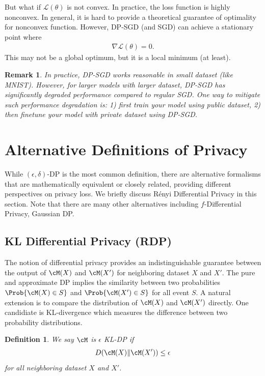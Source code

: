 \documentclass[11pt, a4paper]{article}
\newtheorem{definition}{Definition}
\newtheorem{remark}{Remark}
\begin{document}
But what if $\mathcal{L}(\theta)$ is not convex.
In practice, the loss function is highly nonconvex.
In general, it is hard to provide a theoretical guarantee of optimality for nonconvex function.
However, DP-SGD (and SGD) can achieve a stationary point where
\begin{align}
    \nabla \mathcal{L}(\theta) = 0.
\end{align}
This may not be a global optimum, but it is a local minimum (at least).

\begin{remark}
    In practice, DP-SGD works reasonable in small dataset (like MNIST).
    However, for larger models with larger dataset, DP-SGD has significantly degraded performance compared to regular SGD.
    One way to mitigate such performance degradation is: 1) first train your model using public dataset, 
    2) then finetune your model with private dataset using DP-SGD.
\end{remark}


\section{Alternative Definitions of Privacy}

While $(\epsilon,\delta)$-DP is the most common definition, there are alternative formalisms 
that are mathematically equivalent or closely related, providing different perspectives on privacy loss.
We briefly discuss Rényi Differential Privacy in this section.
Note that there are many other alternatives including $f$-Differential Privacy, Gaussian DP.


\subsection{KL Differential Privacy (RDP)}
The notion of differential privacy provides an indistinguishable guarantee between the output of $\cM(X)$ and $\cM(X')$
for neighboring dataset $X$ and $X'$.
The pure and approximate DP implies the similarity between two probabilities $\Prob{\cM(X)\in S}$ and $\Prob{\cM(X')\in S}$
for all event $S$.
A natural extension is to compare the distribution of $\cM(X)$ and $\cM(X')$ directly.
One candidiate is KL-divergence which measures the difference between two probability distributions.
\begin{definition}
    We say $\cM$ is $\epsilon$ KL-DP if
    \begin{align}
        D(\cM(X)\|\cM(X'))\leq \epsilon
    \end{align}
    for all neighboring dataset $X$ and $X'$.
\end{definition}
\end{document}
